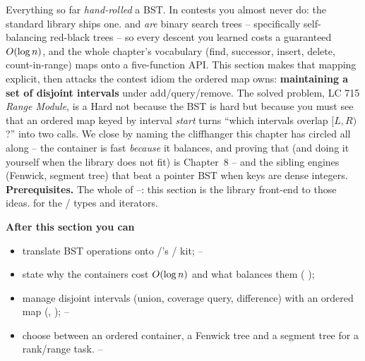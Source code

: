\begin{topicintro}
Everything so far \emph{hand-rolled} a BST. In contests you almost never do: the standard library
ships one.  and  \emph{are} binary search trees -- specifically
self-balancing red-black trees -- so every descent you learned costs a guaranteed $O(\log n)$,
and the whole chapter's vocabulary (find, successor, insert, delete, count-in-range) maps onto a
five-function API. This section makes that mapping explicit, then attacks the contest idiom the
ordered map owns: \textbf{maintaining a set of disjoint intervals} under add/query/remove. The
solved problem, LC 715 \emph{Range Module}, is a Hard not because the BST is hard but because you
must see that an ordered map keyed by interval \emph{start} turns ``which intervals overlap
$[L,R)$?'' into two  calls. We close by naming the cliffhanger this chapter has
circled all along -- the container is fast \emph{because} it balances, and proving that (and doing it
yourself when the library does not fit) is Chapter~8 -- and the sibling engines (Fenwick, segment
tree) that beat a pointer BST when keys are dense integers.
\textbf{Prerequisites.} The whole of --: this section is the
library front-end to those ideas.  for the / types and iterators.

\textbf{After this section you can}
\begin{itemize}[nosep]
  \item translate BST operations onto /'s / kit; \hfill{}--
  \item state why the containers cost $O(\log n)$ and what balances them ( ); \hfill{}
  \item manage disjoint intervals (union, coverage query, difference) with an ordered map
        (, ); \hfill{}--
  \item choose between an ordered container, a Fenwick tree and a segment tree for a rank/range task. \hfill{}--
\end{itemize}
\end{topicintro}

